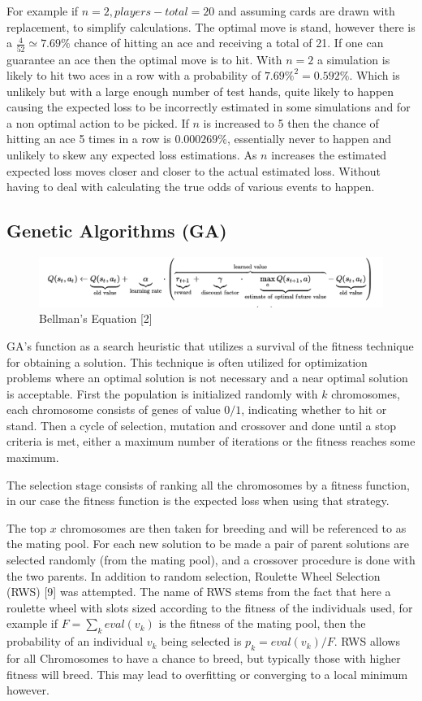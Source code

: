 \documentclass[10pt, a4paper, twocolumn]{article}
\begin{document}
For example if $n = 2, players-total = 20$ and assuming cards are drawn with replacement, to simplify calculations. The optimal move is stand, however there is a $\frac{4}{52} \simeq 7.69\%$ chance of hitting an ace and receiving a total of 21. If one can guarantee an ace then the optimal move is to hit. With $n = 2$ a simulation is likely to hit two aces in a row with a probability of $7.69\%^2 = 0.592\%$. Which is unlikely but with a large enough number of test hands, quite likely to happen causing the expected loss to be incorrectly estimated in some simulations and for a non optimal action to be picked. If $n$ is increased to 5 then the chance of hitting an ace 5 times in a row is $0.000269\%$, essentially never to happen and unlikely to skew any expected loss estimations. As $n$ increases the estimated expected loss moves closer and closer to the actual estimated loss. Without having to deal with calculating the true odds of various events to happen.

\subsection{Genetic Algorithms (GA)}
\begin{figure}
\centerline{\includegraphics[scale=0.55]{qlearn}}
\caption{Bellman's Equation [2] }
\label{fig:qlearn}
\end{figure}
GA's function as a search heuristic that utilizes a survival of the fitness technique for obtaining a solution. This technique is often utilized for optimization problems where an optimal solution is not necessary and a near optimal solution is acceptable. First the population is initialized randomly with $k$ chromosomes, each chromosome consists of genes of value $0/1$, indicating whether to hit or stand. Then a cycle of selection, mutation and crossover and done until a stop criteria is met, either a maximum number of iterations or the fitness reaches some maximum.

The selection stage consists of ranking all the chromosomes by a fitness function, in our case the fitness function is the expected loss when using that strategy. 

The top $x$ chromosomes are then taken for breeding and will be referenced to as the mating pool.  For each new solution to be made a pair of parent solutions are selected randomly (from the mating pool), and a crossover procedure is done with the two parents. In addition to  random selection, Roulette Wheel Selection (RWS) [9] was attempted. The name of RWS stems from the fact that here a roulette wheel with slots sized according to the fitness of the individuals used, for example if $F = \sum_{k}{eval(v_k)}$ is the fitness of the mating pool, then the probability of an individual $v_k$ being selected is $p_k = eval(v_k)/F$. RWS allows for all Chromosomes to have a chance to breed, but typically those with higher fitness will breed. This may lead to overfitting or converging to a local minimum however. 
\end{document}
